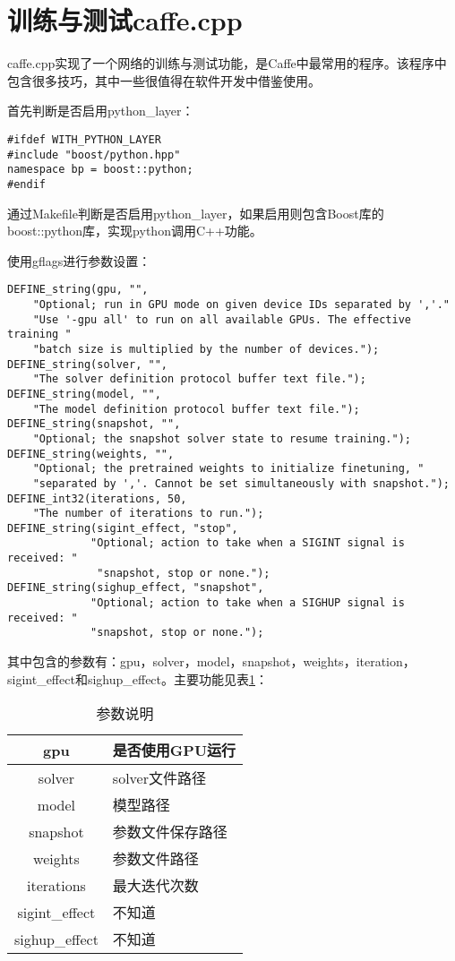 \section{训练与测试caffe.cpp}
caffe.cpp实现了一个网络的训练与测试功能，是Caffe中最常用的程序。该程序中包含很多技巧，其中一些很值得在软件开发中借鉴使用。


首先判断是否启用python\_layer：
\begin{verbatim}
#ifdef WITH_PYTHON_LAYER
#include "boost/python.hpp"
namespace bp = boost::python;
#endif
\end{verbatim}
通过Makefile判断是否启用python\_layer，如果启用则包含Boost库的boost::python库，实现python调用C++功能。


使用gflags进行参数设置：
\begin{verbatim}
DEFINE_string(gpu, "",
    "Optional; run in GPU mode on given device IDs separated by ','."
    "Use '-gpu all' to run on all available GPUs. The effective training "
    "batch size is multiplied by the number of devices.");
DEFINE_string(solver, "",
    "The solver definition protocol buffer text file.");
DEFINE_string(model, "",
    "The model definition protocol buffer text file.");
DEFINE_string(snapshot, "",
    "Optional; the snapshot solver state to resume training.");
DEFINE_string(weights, "",
    "Optional; the pretrained weights to initialize finetuning, "
    "separated by ','. Cannot be set simultaneously with snapshot.");
DEFINE_int32(iterations, 50,
    "The number of iterations to run.");
DEFINE_string(sigint_effect, "stop",
             "Optional; action to take when a SIGINT signal is received: "
              "snapshot, stop or none.");
DEFINE_string(sighup_effect, "snapshot",
             "Optional; action to take when a SIGHUP signal is received: "
             "snapshot, stop or none.");
\end{verbatim}
其中包含的参数有：gpu，solver，model，snapshot，weights，iteration，sigint\_effect和sighup\_effect。主要功能见表\ref{tab:参数说明}：
\begin{table}[h]
  \setlength{\abovecaptionskip}{-5pt}
  \caption{参数说明}
  \centering
  \begin{tabular}{|c|l|}
    \hline
    gpu & 是否使用GPU运行 \\ \hline
    solver & solver文件路径 \\ \hline
    model & 模型路径 \\ \hline
    snapshot & 参数文件保存路径 \\ \hline
    weights & 参数文件路径 \\ \hline
    iterations & 最大迭代次数 \\ \hline
    sigint\_effect & 不知道 \\ \hline
    sighup\_effect & 不知道 \\
    \hline
  \end{tabular}
  \label{tab:参数说明}
\end{table}